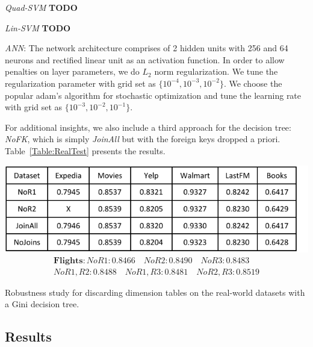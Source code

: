 \documentclass{vldb}
\begin{document}
\vspace{2mm}
\noindent \textit{Quad-SVM} \textbf{TODO}

\vspace{2mm}
\noindent \textit{Lin-SVM} \textbf{TODO}

\vspace{2mm}
\noindent \textit{ANN}: The network architecture comprises of 2 hidden units with 256 and 64 neurons and rectified linear unit as an activation function. In order to allow penalties on layer parameters, we do $L_2$ norm regularization. We tune the regularization parameter with grid set as $\{ 10^{-4}, 10^{-3}, 10^{-2} \}$. We choose the popular adam's algorithm for stochastic optimization and tune the learning rate with grid set as $\{ 10^{-3}, 10^{-2}, 10^{-1} \}$. 

For additional insights, we also include a third approach for the decision tree: \textit{NoFK}, which is simply \textit{JoinAll} but with the foreign keys dropped a priori.
Table~\ref{Table:RealTest} presents the results.

\begin{table}[t]
\centering
\includegraphics[width=\columnwidth,height=\textheight,keepaspectratio]{table4.pdf}
\begin{align*}
\textbf{Flights} : NoR1: 0.8466 \quad NoR2: 0.8490 \quad NoR3: 0.8483 \\
No R1,R2: 0.8488 \quad No R1,R3: 0.8481 \quad No R2,R3: 0.8519
\end{align*}
\caption{Robustness study for discarding dimension tables on the real-world datasets with a Gini decision tree.}
\label{Table:robustness}
\end{table}

\subsection{Results}
\end{document}
